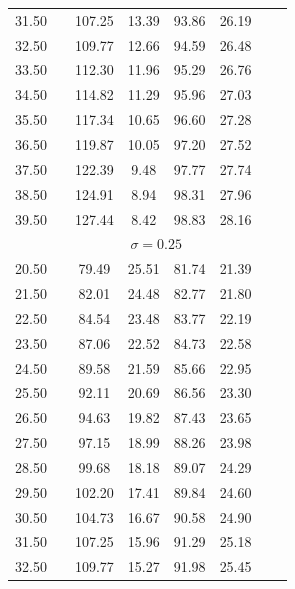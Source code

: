 \documentclass{article}
\begin{document}
\begin{table}[h]
{\begin{tabularx}{\linewidth}{cXcccccr}
         31.50  &&      107.25   &      13.39  &       93.86 &        26.19\\
         32.50  &&      109.77   &      12.66  &       94.59 &        26.48\\
         33.50  &&      112.30   &      11.96  &       95.29 &        26.76\\
         34.50  &&      114.82   &      11.29  &       95.96 &        27.03\\
         35.50  &&      117.34   &      10.65  &       96.60 &        27.28\\
         36.50  &&      119.87   &      10.05  &       97.20 &        27.52\\
         37.50  &&      122.39   &       9.48  &       97.77 &        27.74\\
         38.50  &&      124.91   &       8.94  &       98.31 &        27.96\\
         39.50  &&      127.44   &       8.42  &       98.83 &        28.16\\
			\hline 
		&\multicolumn{5}{c}{$\sigma=0.25$} \\
		\hline 
		     20.50  &&       79.49  &       25.51   &      81.74  &       21.39\\
         21.50  &&       82.01  &       24.48   &      82.77  &       21.80\\
         22.50  &&       84.54  &       23.48   &      83.77  &       22.19\\
         23.50  &&       87.06  &       22.52   &      84.73  &       22.58\\
         24.50  &&       89.58  &       21.59   &      85.66  &       22.95\\
         25.50  &&       92.11  &       20.69   &      86.56  &       23.30\\
         26.50  &&       94.63  &       19.82   &      87.43  &       23.65\\
         27.50  &&       97.15  &       18.99   &      88.26  &       23.98\\
         28.50  &&       99.68  &       18.18   &      89.07  &       24.29\\
         29.50  &&      102.20  &       17.41   &      89.84  &       24.60\\
         30.50  &&      104.73  &       16.67   &      90.58  &       24.90\\
         31.50  &&      107.25  &       15.96   &      91.29  &       25.18\\
         32.50  &&      109.77  &       15.27   &      91.98  &       25.45\\

\end{tabularx}}
\end{table}
\end{document}
